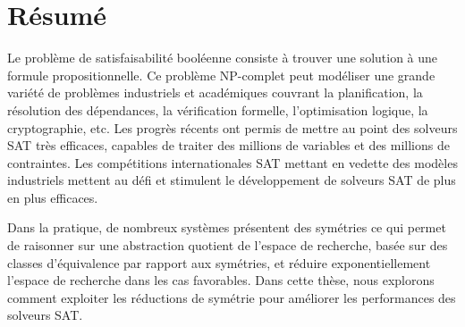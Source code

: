 
\chapter*{Résumé}
Le problème de satisfaisabilité booléenne consiste à trouver une solution à une formule  propositionnelle.
Ce problème NP-complet peut modéliser une grande variété de problèmes industriels et académiques couvrant la planification, la résolution des dépendances, la vérification formelle, l'optimisation logique, la cryptographie, etc.
Les  progrès récents ont permis de mettre au point des solveurs SAT très efficaces, capables de traiter des millions de variables et des millions de contraintes. 
Les compétitions internationales SAT mettant en vedette des modèles industriels mettent au défi et stimulent le développement de solveurs SAT de plus en plus efficaces.

Dans la pratique, de nombreux systèmes présentent des symétries ce qui permet de raisonner sur une abstraction quotient de l'espace de recherche, basée sur des classes d'équivalence par rapport aux symétries, et réduire exponentiellement l'espace de recherche dans les cas favorables.
Dans cette thèse, nous explorons comment exploiter les réductions de symétrie pour améliorer les performances des solveurs SAT.

